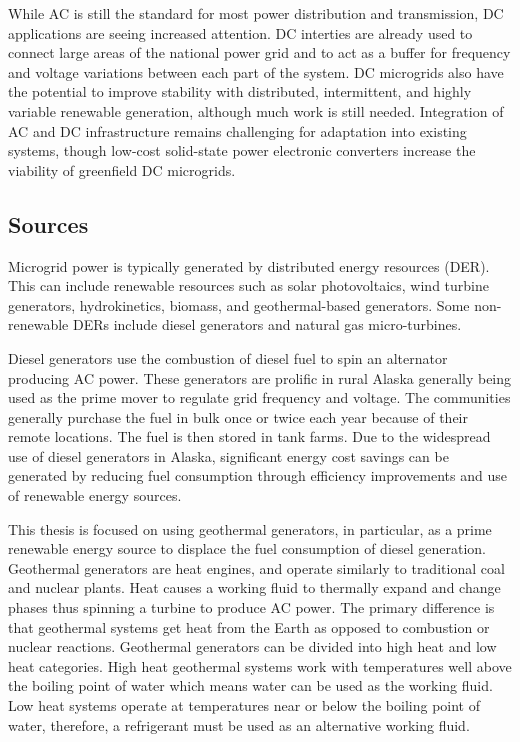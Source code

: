 While AC is still the standard for most power distribution and transmission, DC applications are seeing increased attention. DC interties are already used to connect large areas of the national power grid and to act as a buffer for frequency and voltage variations between each part of the system. DC microgrids also have the potential to improve stability with distributed, intermittent, and highly variable renewable generation, although much work is still needed. Integration of AC and DC infrastructure remains challenging for adaptation into existing systems, though low-cost solid-state power electronic converters increase the viability of greenfield DC microgrids.

\subsection{Sources}
Microgrid power is typically generated by distributed energy resources (DER). This can include renewable resources such as solar photovoltaics, wind turbine generators, hydrokinetics, biomass, and geothermal-based generators. Some non-renewable DERs include diesel generators and natural gas micro-turbines. 

Diesel generators use the combustion of diesel fuel to spin an alternator producing AC power. These generators are prolific in rural Alaska generally being used as the prime mover to regulate grid frequency and voltage. The communities  generally purchase the fuel in bulk once or twice each year because of their remote locations. The fuel is then stored in tank farms.
Due to the widespread use of diesel generators in Alaska, significant energy cost savings can be generated by reducing fuel consumption through efficiency improvements and use of renewable energy sources. 

This thesis is focused on using geothermal generators, in particular, as a prime renewable energy source to displace the fuel consumption of diesel generation. Geothermal generators are heat engines, and operate similarly to traditional coal and nuclear plants. Heat causes a working fluid to thermally expand and change phases thus spinning a turbine to produce AC power. The primary difference is that geothermal systems get heat from the Earth as opposed to combustion or nuclear reactions. Geothermal generators can be divided into high heat and low heat categories. High heat geothermal systems work with temperatures well above the boiling point of water which means water can be used as the working fluid. Low heat systems operate at temperatures near or below the boiling point of water, therefore, a refrigerant must be used as an alternative working fluid. 

